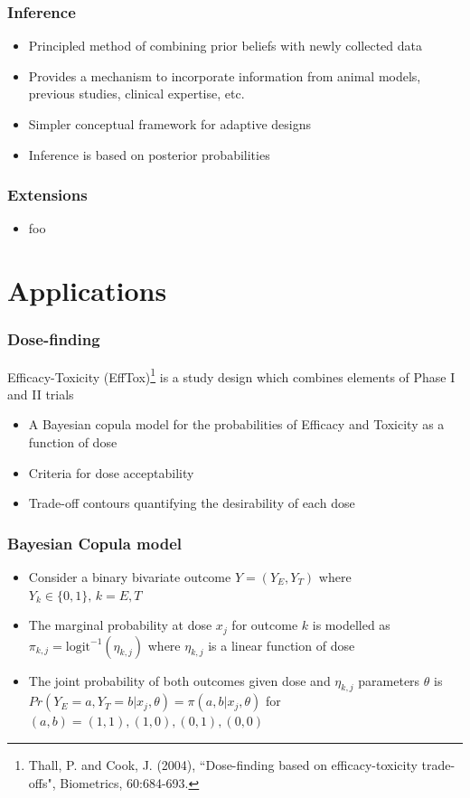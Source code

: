 \documentclass{beamer}
\begin{document}
	\begin{frame}
		\frametitle{Inference}
		\begin{itemize}
			\setlength\itemsep{2em}
			\item Principled method of combining prior beliefs with newly collected data 
			\item Provides a mechanism to incorporate information from animal models, previous studies, clinical expertise, etc.
			\item Simpler conceptual framework for adaptive designs
			\item Inference is based on posterior probabilities
		\end{itemize}
	\end{frame}	


	\begin{frame}
		\frametitle{Extensions}
		\begin{itemize}
			\setlength\itemsep{2em}
			\item foo
		\end{itemize}
	\end{frame}		
	
\section{Applications}
	
	\begin{frame}
		\frametitle{Dose-finding}
		Efficacy-Toxicity (EffTox)\footnote{Thall, P. and Cook, J. (2004), ``Dose-finding based on efficacy-toxicity trade-offs", Biometrics, 60:684-693.} is a study design which combines elements of Phase I and II trials
		\begin{itemize}
			\setlength\itemsep{1.5em}
		\item A Bayesian copula model for the probabilities of Efficacy and Toxicity as a function of dose
		\item Criteria for dose acceptability
        \item Trade-off contours quantifying the desirability of each dose
		\end{itemize}
	\end{frame}

	\begin{frame}
		\frametitle{Bayesian Copula model} 
		\begin{itemize}
			\setlength\itemsep{2em}
			\item Consider a binary bivariate outcome $Y=(Y_E,Y_T)$ where $Y_k \in \{0,1\},\,k=E,T$ 
			\item The marginal probability at dose $x_j$ for outcome $k$ is modelled as
			$\pi_{k,j}=\text{logit}^{-1}(\eta_{k,j})$ where $\eta_{k,j}$ is a linear function of dose
			\item The joint probability of both outcomes given dose and $\eta_{k,j}$ parameters $\theta$ is $Pr(Y_E=a,Y_T=b|x_j,\theta)=\pi(a,b|x_j,\theta)$ for $(a,b)=(1,1),(1,0),(0,1),(0,0)$
			
		\end{itemize}
	\end{frame}
	
\end{document}
